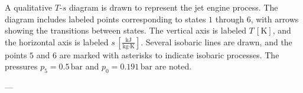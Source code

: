 A qualitative \( T \)-\( s \) diagram is drawn to represent the jet engine process. The diagram includes labeled points corresponding to states \( 1 \) through \( 6 \), with arrows showing the transitions between states. The vertical axis is labeled \( T \, [\text{K}] \), and the horizontal axis is labeled \( s \, [\frac{\text{kJ}}{\text{kg·K}}] \). Several isobaric lines are drawn, and the points \( 5 \) and \( 6 \) are marked with asterisks to indicate isobaric processes. The pressures \( p_5 = 0.5 \, \text{bar} \) and \( p_0 = 0.191 \, \text{bar} \) are noted.

---